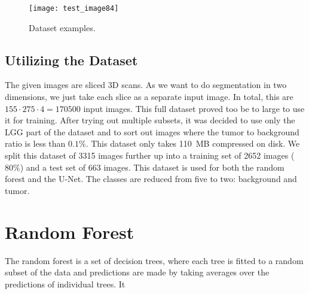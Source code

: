 \documentclass[final]{article}
\begin{document}
\begin{figure}
\centering
\texttt{[image: test\_image84]}
\caption{Dataset examples. }
\label{fig:dataex}
\end{figure}

\subsection{Utilizing the Dataset}
The given images are sliced 3D scans. As we want to do segmentation in two
dimensions, we just take each slice as a separate input image. In total, this
are $155\cdot275\cdot4 = 170500$ input images. This full dataset proved too be
to large to use it for training. After trying out multiple subsets, it was
decided to use only the LGG part of the dataset and to sort out images where
the tumor to background ratio is less than $0.1\%$. This dataset only takes
\SI{110}{MB} compressed on disk. We split this dataset of 3315 images further
up into a training set of 2652 images ($80\%$) and a test set of 663 images.
This dataset is used for both the random forest and the U-Net. The classes are
reduced from five to two: background and tumor.

\section{Random Forest}
The random forest is a set of decision trees, where each tree is fitted to a
random subset of the data and predictions are made by taking averages over the
predictions of individual trees. It 
\end{document}
